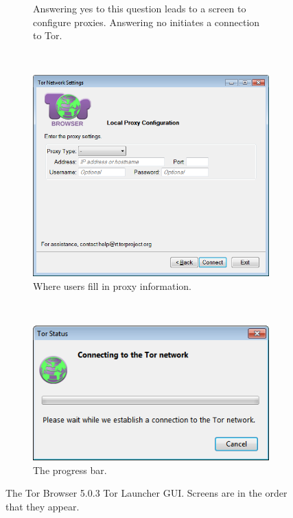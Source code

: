 \documentclass[USenglish,oneside,twocolumn]{article}
\begin{document}
\begin{figure}
\begin{subfigure}[b]{0.30\textwidth}
	\caption{Answering yes to this question leads to a screen to configure proxies. Answering no initiates a connection to Tor.}
	\label{fig:old-proxy}
\end{subfigure}
~~~~~~~~~~
\begin{subfigure}[b]{0.30\textwidth}
	\includegraphics[width=\textwidth]{screenshots/OLD-proxyYES.png}
	\caption{Where users fill in proxy information.}
	\label{fig:old-proxy-yes}
\end{subfigure}
~~~~~~~~~~
\begin{subfigure}[b]{0.30\textwidth}
	\includegraphics[width=\textwidth]{screenshots/OLD-progress.png}
	\caption{The progress bar.}
	\label{fig:old-progress}
\end{subfigure}
\caption{
The Tor Browser 5.0.3 Tor Launcher GUI. Screens are in the order that they appear. 
}
\label{fig:old-interface}
\end{figure} 
\end{document}
